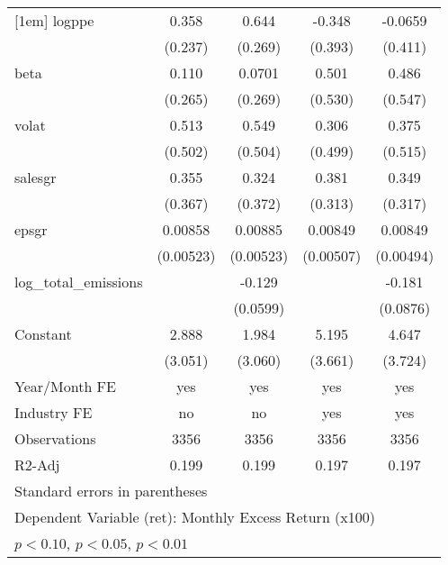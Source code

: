 \begin{table}[htbp]
\begin{tabular}{l*{4}{c}}
[1em]
logppe              &       0.358         &       0.644\sym{**} &      -0.348         &     -0.0659         \\
                    &     (0.237)         &     (0.269)         &     (0.393)         &     (0.411)         \\
[1em]
beta                &       0.110         &      0.0701         &       0.501         &       0.486         \\
                    &     (0.265)         &     (0.269)         &     (0.530)         &     (0.547)         \\
[1em]
volat               &       0.513         &       0.549         &       0.306         &       0.375         \\
                    &     (0.502)         &     (0.504)         &     (0.499)         &     (0.515)         \\
[1em]
salesgr             &       0.355         &       0.324         &       0.381         &       0.349         \\
                    &     (0.367)         &     (0.372)         &     (0.313)         &     (0.317)         \\
[1em]
epsgr               &     0.00858         &     0.00885\sym{*}  &     0.00849\sym{*}  &     0.00849\sym{*}  \\
                    &   (0.00523)         &   (0.00523)         &   (0.00507)         &   (0.00494)         \\
[1em]
log\_total\_emissions &                     &      -0.129\sym{**} &                     &      -0.181\sym{**} \\
                    &                     &    (0.0599)         &                     &    (0.0876)         \\
[1em]
Constant            &       2.888         &       1.984         &       5.195         &       4.647         \\
                    &     (3.051)         &     (3.060)         &     (3.661)         &     (3.724)         \\
\hline
Year/Month FE       &         yes         &         yes         &         yes         &         yes         \\
Industry FE         &          no         &          no         &         yes         &         yes         \\
Observations        &        3356         &        3356         &        3356         &        3356         \\
R2-Adj              &       0.199         &       0.199         &       0.197         &       0.197         \\
\hline\hline
\multicolumn{5}{l}{\footnotesize Standard errors in parentheses}\\
\multicolumn{5}{l}{\footnotesize Dependent Variable (ret): Monthly Excess Return (x100)}\\
\multicolumn{5}{l}{\footnotesize \sym{*} \(p<0.10\), \sym{**} \(p<0.05\), \sym{***} \(p<0.01\)}\\
\end{tabular}
\end{table}
